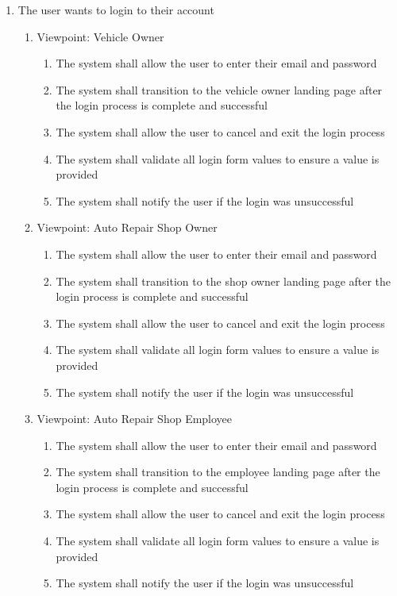 \documentclass[12pt]{article}
\begin{document}
\begin{enumerate}[label=BE\arabic*., series=business_events]
	\item The user wants to login to their account
	      \begin{enumerate}[VP\arabic*.]
		      \item Viewpoint: Vehicle Owner
		            \begin{enumerate}
			            \item The system shall allow the user to enter their email and password
			            \item The system shall transition to the vehicle owner landing page after the login process is complete
			                  and successful
			            \item The system shall allow the user to cancel and exit the login process
			            \item The system shall validate all login form values to ensure a value is provided
			            \item The system shall notify the user if the login was unsuccessful
		            \end{enumerate}

		      \item Viewpoint: Auto Repair Shop Owner
		            \begin{enumerate}
			            \item The system shall allow the user to enter their email and password
			            \item The system shall transition to the shop owner landing page after the login process is complete and
			                  successful
			            \item The system shall allow the user to cancel and exit the login process
			            \item The system shall validate all login form values to ensure a value is provided
			            \item The system shall notify the user if the login was unsuccessful
		            \end{enumerate}

		      \item Viewpoint: Auto Repair Shop Employee
		            \begin{enumerate}
			            \item The system shall allow the user to enter their email and password
			            \item The system shall transition to the employee landing page after the login process is complete and
			                  successful
			            \item The system shall allow the user to cancel and exit the login process
			            \item The system shall validate all login form values to ensure a value is provided
			            \item The system shall notify the user if the login was unsuccessful
		            \end{enumerate}
	      \end{enumerate}


\end{enumerate}
\end{document}
